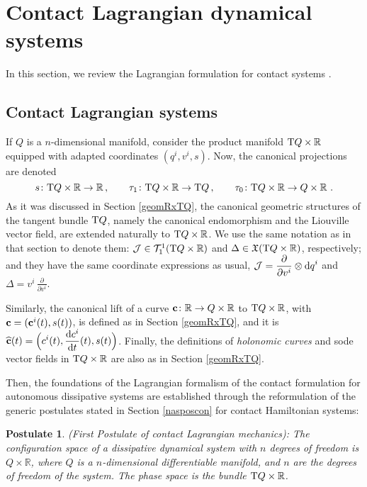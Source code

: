 \documentclass[12pt]{report}
\newtheorem{pos}[teor]{Postulate}
\def\dst{\displaystyle}
\def\vf{\mathfrak X}
\def\d{{\rm d}}
\def\Real{\mathbb{R}}
\def\Tan{{\rm T}}
\begin{document}
\section{Contact Lagrangian dynamical systems}


In this section, we review the Lagrangian formulation for contact systems \cite{CIAGLIA2018,DeLeon2019,GGMRR-2019b}.


\subsection{Contact Lagrangian systems}
\label{sec-conLagsys}


If $Q$ is a $n$-dimensional manifold, consider the product manifold 
$\Tan Q\times\Real$ equipped with adapted coordinates $(q^i,v^i, s)$.
Now, the canonical projections are denoted
$$ 
s\colon \Tan Q\times\Real\to\Real \,, \qquad \tau_1\colon \Tan Q\times\Real\to\Tan Q\,, \qquad \tau_0\colon \Tan Q\times\Real\to Q\times\Real\ . 
$$
As it was discussed in Section \ref{geomRxTQ},
the canonical geometric structures of the tangent bundle $\Tan Q$, 
namely the canonical endomorphism and the Liouville vector field, 
are extended naturally to $\Tan Q\times\Real$.
We use the same notation as in that section
to denote them: ${\cal J}\in{\cal T}^1_1(\Tan Q\times\Real)$ and $\Delta\in\vf(\Tan Q\times\Real)$, respectively;
and they have the same coordinate expressions as usual,
$\dst{\cal J} = \frac{\partial}{\partial v^i}\otimes \d q^i$ and $\dst\Delta = v^i\, \frac{\partial}{\partial v^i}$.

Similarly, the canonical lift of a curve ${\bf c}\colon\Real \rightarrow Q\times\Real$ to $\Tan Q\times\Real$, 
with ${\bf c} = (\mathbf{c}^i(t),s(t))$,
is defined as in Section \ref{geomRxTQ}, and it is
$\dst{\bf\widehat c}(t)=\Big(c^i(t),\frac{\d c^i}{\d t}(t), s(t)\Big)$.
Finally, the definitions of {\sl holonomic curves} and {\sc sode} vector fields in $\Tan Q\times\Real$
are also as in Section \ref{geomRxTQ}.

Then, the foundations of the Lagrangian formalism of the contact formulation for autonomous dissipative systems
are established through the reformulation of the generic postulates stated in Section \ref{nasposcon} for contact Hamiltonian systems:

\begin{pos}
{\rm (First Postulate of contact Lagrangian mechanics\/)}:
The configuration space of a dissipative dynamical system with $n$ degrees of freedom 
is $Q\times\Real$, where $Q$ is a $n$-dimensional differentiable manifold, and $n$ are the degrees of freedom of the system.
The phase space is the bundle $\Tan Q\times\Real$.
\end{pos}
\end{document}
